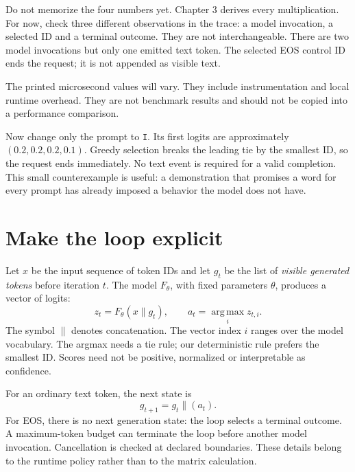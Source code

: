 Do not memorize the four numbers yet. Chapter 3 derives every multiplication.
For now, check three different observations in the trace: a model invocation,
a selected ID and a terminal outcome. They are not interchangeable.
There are two model invocations but only one emitted text token. The selected
EOS control ID ends the request; it is not appended as visible text.

The printed microsecond values will vary. They include instrumentation and
local runtime overhead. They are not benchmark results and should not be copied
into a performance comparison.


Now change only the prompt to \texttt{I}. Its first logits are approximately
$(0.2,0.2,0.2,0.1)$. Greedy selection breaks the leading tie by the smallest ID,
so the request ends immediately. No text event is required for a valid
completion. This small counterexample is useful: a demonstration that promises
a word for every prompt has already imposed a behavior the model does not have.

\section{Make the loop explicit}
Let $x$ be the input sequence of token IDs and let $g_t$ be the list of
\emph{visible generated tokens} before iteration $t$. The model $F_\theta$,
with fixed parameters $\theta$, produces a vector of logits:
\begin{equation}
z_t=F_\theta(x\mathbin{\|}g_t),\qquad
a_t=\operatorname*{arg\,max}_{i}z_{t,i}.
\label{eq:lifecycle-choice}
\end{equation}
The symbol $\|$ denotes concatenation. The vector index $i$ ranges over the
model vocabulary. The argmax needs a tie rule; our deterministic rule prefers
the smallest ID. Scores need not be positive, normalized or interpretable as
confidence.

For an ordinary text token, the next state is
\begin{equation}
g_{t+1}=g_t\mathbin{\|}(a_t).
\label{eq:lifecycle-feedback}
\end{equation}
For EOS, there is no next generation state: the loop selects a terminal
outcome. A maximum-token budget can terminate the loop before another model
invocation. Cancellation is checked at declared boundaries. These details
belong to the runtime policy rather than to the matrix calculation.

